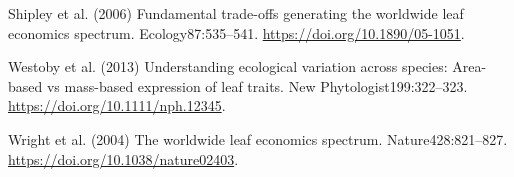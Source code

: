 \documentclass[
  12pt,
  letterpaper,
  DIV=11,
  numbers=noendperiod]{scrartcl}
\newlength{\cslhangindent}
\newenvironment{CSLReferences}[2] %
 {\begin{list}{}{%
  \setlength{\itemindent}{0pt}
  \setlength{\leftmargin}{0pt}
  \setlength{\parsep}{0pt}
  \ifodd #1
   \setlength{\leftmargin}{\cslhangindent}
   \setlength{\itemindent}{-1\cslhangindent}
  \fi
  \setlength{\itemsep}{#2\baselineskip}}}
 {\end{list}}
\numberwithin{equation}{section}
\begin{document}
\begin{CSLReferences}{1}{1}
Shipley et al. (2006) Fundamental trade-offs generating the worldwide
leaf economics spectrum. Ecology87:535--541.
\url{https://doi.org/10.1890/05-1051}.

Westoby et al. (2013) Understanding ecological variation across species:
{Area-based} vs mass-based expression of leaf traits. New
Phytologist199:322--323. \url{https://doi.org/10.1111/nph.12345}.

Wright et al. (2004) The worldwide leaf economics spectrum.
Nature428:821--827. \url{https://doi.org/10.1038/nature02403}.

\end{CSLReferences}
\end{document}
